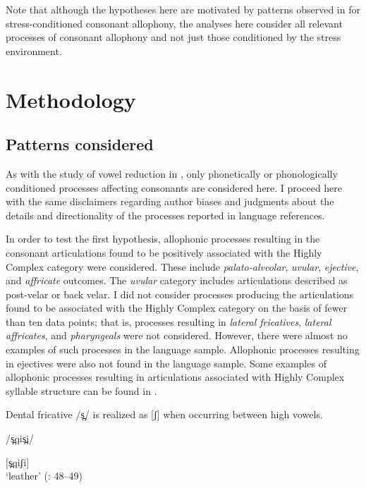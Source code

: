   Note that although the hypotheses here are motivated by patterns observed in  for stress-conditioned consonant allophony, the analyses here consider all relevant processes of consonant allophony and not just those conditioned by the stress environment.

\section{Methodology}\label{sec:7.2}
\subsection{Patterns considered}\label{sec:7.2.1}

  As with the study of vowel reduction in , only phonetically or phonologically conditioned processes affecting consonants are considered here. I proceed here with the same disclaimers regarding author biases and judgments about the details and directionality of the processes reported in language references.

  In order to test the first hypothesis, allophonic processes resulting in the consonant articulations found to be positively associated with the Highly Complex category were considered. These include \textit{palato-alveolar}, \textit{uvular}, \textit{ejective}, and \textit{affricate} outcomes. The \textit{uvular} category includes articulations described as post-velar or back velar. I did not consider processes producing the articulations found to be associated with the Highly Complex category on the basis of fewer than ten data points; that is, processes resulting in \textit{lateral fricatives}, \textit{lateral affricates}, and \textit{pharyngeals} were not considered. However, there were almost no examples of such processes in the language sample. Allophonic processes resulting in ejectives were also not found in the language sample. Some examples of allophonic processes resulting in articulations associated with Highly Complex syllable structure can be found in .

\ea\label{ex:7.3}

Dental fricative /s̪/ is realized as [ʃ] when occurring between high vowels.

/s̪qis̪i/

[s̪qiʃi]\\
\glt ‘leather’
(\citealt{Cerrón-Palomino2006}: 48--49)
\z

\ea\label{ex:7.4}

